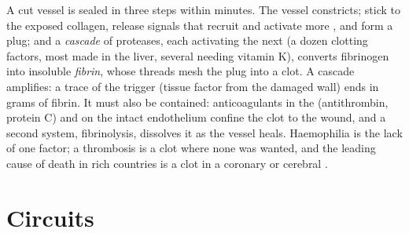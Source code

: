 \begin{proposition}[Haemostasis]\label{prop:b2:blood-circulation:clotting}
A cut vessel is sealed in three steps within minutes. The vessel
constricts;  stick to the exposed collagen, release
signals that recruit and activate more , and form a plug;
and a \emph{cascade} of  proteases, each activating the next
(a dozen clotting factors, most made in the liver, several needing
vitamin K), converts fibrinogen into insoluble \emph{fibrin}, whose
threads mesh the plug into a clot. A cascade amplifies: a trace of
the trigger (tissue factor from the damaged wall) ends in grams of
fibrin. It must also be contained: anticoagulants in the 
(antithrombin, protein C) and on the intact endothelium confine the
clot to the wound, and a second system, fibrinolysis, dissolves it
as the vessel heals. Haemophilia is the lack of one factor; a
thrombosis is a clot where none was wanted, and the leading cause of
death in rich countries is a clot in a coronary or cerebral .
\end{proposition}

\section{Circuits}

